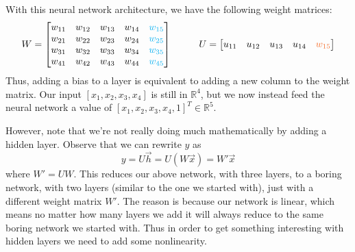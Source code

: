 \documentclass[12pt,letterpaper]{book}
\theoremstyle{definition}
\begin{document}
\begin{center}
  \end{center}
  With this neural network architecture, we have the following weight matrices:
  \[
    W = \begin{bmatrix}
      w_{11} & w_{12} & w_{13} & w_{14} & \textcolor{ProcessBlue}{w_{15}} \\
      w_{21} & w_{22} & w_{23} & w_{24} & \textcolor{ProcessBlue}{w_{25}}\\
      w_{31} & w_{32} & w_{33} & w_{34} & \textcolor{ProcessBlue}{w_{35}}\\
      w_{41} & w_{42} & w_{43} & w_{44} & \textcolor{ProcessBlue}{w_{45}}\\
    \end{bmatrix}
    \hspace{1cm}
    U = \begin{bmatrix}
      u_{11} & u_{12} & u_{13} & u_{14} & \textcolor{Orange}{w_{15}} \\
    \end{bmatrix}
  \]
  Thus, adding a bias to a layer is equivalent to adding a new column to the weight matrix. 
  Our input $[x_1, x_2, x_3, x_4]$ is still in $\mathbb{R}^4$, but we now instead 
  feed the neural network a value of $[x_1, x_2, x_3, x_4, 1]^T \in \mathbb{R}^5.$

  However, note that we're not really doing much mathematically by adding a hidden layer. 
  Observe that we can rewrite $y$ as 
  \[
      y = U\vec{h} = U(W\vec{x}) = W'\vec{x} 
  \]
  where $W' = UW$. This reduces our above network, with three layers, to a boring network, with two layers (similar to the one 
  we started with), just with a different weight matrix $W'$. 
  The reason is because our network is linear, which means 
  no matter how many layers we add it will always reduce to the same boring network we started with. 
  Thus in order to get something interesting with hidden layers we need to add some nonlinearity.
  
\end{document}
